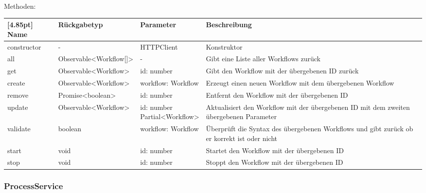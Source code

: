                 Methoden:
        		\begin{center}
                \setlength\tabcolsep{5pt}
                	\renewcommand{\arraystretch}{1.5}
                    	\begin{tabularx}{\textwidth}{|l|l|l|X|}
                    	\hline
                    	\rowcolor[gray]{0.75}[4.85pt]
                		Name & Rückgabetyp & Parameter & Beschreibung \\ \hline 
                        constructor & - & HTTPClient & Konstruktor \\ \hline
                        all & Observable<Workflow[]> & - & Gibt eine Liste aller Workflows zurück\\ \hline
                        get & Observable<Workflow> & id: number & Gibt den Workflow mit der übergebenen ID zurück \\ \hline
                        create & Observable<Workflow> & workflow: Workflow & Erzeugt einen neuen Workflow mit dem übergebenen Workflow \\ \hline
                        remove & Promise<boolean> & id: number & Entfernt den Workflow mit der übergebenen ID \\ \hline
                        update & Observable<Workflow> & \thead{id: number\\Partial<Workflow>} & Aktualisiert den Workflow mit der übergebenen ID mit dem zweiten übergebenen Parameter \\ \hline
                        validate & boolean & workflow: Workflow & Überprüft die Syntax des übergebenen Workflows und gibt zurück ob er korrekt ist oder nicht \\ \hline
                        start & void & id: number & Startet den Workflow mit der übergebenen ID \\ \hline
                        stop & void & id: number & Stoppt den Workflow mit der übergebenen ID \\ \hline
                        \end{tabularx}
        		\end{center}
            
            \subsubsection{ProcessService}
            
